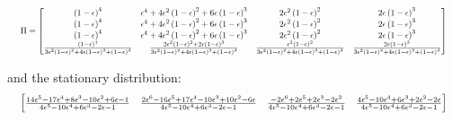 \documentclass[WP]{AEA}
\begin{document}
 \begin{equation*}
 	\resizebox{\textwidth}{!}{
$	\Pi = 
	\left[
		\begin{matrix}
			\left(1 - \epsilon\right)^{4} & \epsilon^{4} + 4 \epsilon^{2} \left(1 - \epsilon\right)^{2} + 6 \epsilon \left(1 - \epsilon\right)^{3} & 2 \epsilon^{2} \left(1 - \epsilon\right)^{2} & 2 \epsilon \left(1 - \epsilon\right)^{3}\\\left(1 - \epsilon\right)^{4} & \epsilon^{4} + 4 \epsilon^{2} \left(1 - \epsilon\right)^{2} + 6 \epsilon \left(1 - \epsilon\right)^{3} & 2 \epsilon^{2} \left(1 - \epsilon\right)^{2} & 2 \epsilon \left(1 - \epsilon\right)^{3}\\\left(1 - \epsilon\right)^{4} & \epsilon^{4} + 4 \epsilon^{2} \left(1 - \epsilon\right)^{2} + 6 \epsilon \left(1 - \epsilon\right)^{3} & 2 \epsilon^{2} \left(1 - \epsilon\right)^{2} & 2 \epsilon \left(1 - \epsilon\right)^{3}\\\frac{\left(1 - \epsilon\right)^{4}}{3 \epsilon^{2} \left(1 - \epsilon\right)^{2} + 4 \epsilon \left(1 - \epsilon\right)^{3} + \left(1 - \epsilon\right)^{4}} & \frac{2 \epsilon^{2} \left(1 - \epsilon\right)^{2} + 2 \epsilon \left(1 - \epsilon\right)^{3}}{3 \epsilon^{2} \left(1 - \epsilon\right)^{2} + 4 \epsilon \left(1 - \epsilon\right)^{3} + \left(1 - \epsilon\right)^{4}} & \frac{\epsilon^{2} \left(1 - \epsilon\right)^{2}}{3 \epsilon^{2} \left(1 - \epsilon\right)^{2} + 4 \epsilon \left(1 - \epsilon\right)^{3} + \left(1 - \epsilon\right)^{4}} & \frac{2 \epsilon \left(1 - \epsilon\right)^{3}}{3 \epsilon^{2} \left(1 - \epsilon\right)^{2} + 4 \epsilon \left(1 - \epsilon\right)^{3} + \left(1 - \epsilon\right)^{4}}
		\end{matrix}
	\right] 
	$
}
\end{equation*}

and the stationary distribution:
 \begin{equation*}
	\resizebox{\textwidth}{!}{
		$	
		\left[\begin{matrix}\frac{14 \epsilon^{5} - 17 \epsilon^{4} + 8 \epsilon^{3} - 10 \epsilon^{2} + 6 \epsilon - 1}{4 \epsilon^{5} - 10 \epsilon^{4} + 6 \epsilon^{3} - 2 \epsilon - 1} & \frac{2 \epsilon^{6} - 16 \epsilon^{5} + 17 \epsilon^{4} - 10 \epsilon^{3} + 10 \epsilon^{2} - 6 \epsilon}{4 \epsilon^{5} - 10 \epsilon^{4} + 6 \epsilon^{3} - 2 \epsilon - 1} & \frac{- 2 \epsilon^{6} + 2 \epsilon^{5} + 2 \epsilon^{3} - 2 \epsilon^{2}}{4 \epsilon^{5} - 10 \epsilon^{4} + 6 \epsilon^{3} - 2 \epsilon - 1} & \frac{4 \epsilon^{5} - 10 \epsilon^{4} + 6 \epsilon^{3} + 2 \epsilon^{2} - 2 \epsilon}{4 \epsilon^{5} - 10 \epsilon^{4} + 6 \epsilon^{3} - 2 \epsilon - 1}\end{matrix}\right] 
		$
	}
\end{equation*}
\end{document}
